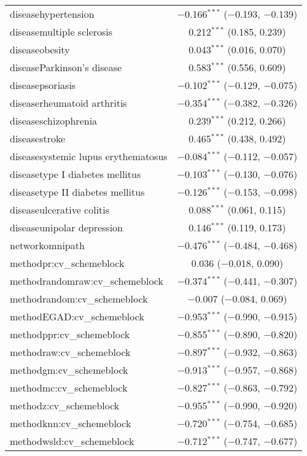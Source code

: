 \begin{table}[!htbp]
\begin{tabular}{@{\extracolsep{5pt}}lc}
  diseasehypertension & $-$0.166$^{***}$ ($-$0.193, $-$0.139) \\ 
  diseasemultiple sclerosis & 0.212$^{***}$ (0.185, 0.239) \\ 
  diseaseobesity & 0.043$^{***}$ (0.016, 0.070) \\ 
  diseaseParkinson's disease & 0.583$^{***}$ (0.556, 0.609) \\ 
  diseasepsoriasis & $-$0.102$^{***}$ ($-$0.129, $-$0.075) \\ 
  diseaserheumatoid arthritis & $-$0.354$^{***}$ ($-$0.382, $-$0.326) \\ 
  diseaseschizophrenia & 0.239$^{***}$ (0.212, 0.266) \\ 
  diseasestroke & 0.465$^{***}$ (0.438, 0.492) \\ 
  diseasesystemic lupus erythematosus & $-$0.084$^{***}$ ($-$0.112, $-$0.057) \\ 
  diseasetype I diabetes mellitus & $-$0.103$^{***}$ ($-$0.130, $-$0.076) \\ 
  diseasetype II diabetes mellitus & $-$0.126$^{***}$ ($-$0.153, $-$0.098) \\ 
  diseaseulcerative colitis & 0.088$^{***}$ (0.061, 0.115) \\ 
  diseaseunipolar depression & 0.146$^{***}$ (0.119, 0.173) \\ 
  networkomnipath & $-$0.476$^{***}$ ($-$0.484, $-$0.468) \\ 
  methodpr:cv\_schemeblock & 0.036 ($-$0.018, 0.090) \\ 
  methodrandomraw:cv\_schemeblock & $-$0.374$^{***}$ ($-$0.441, $-$0.307) \\ 
  methodrandom:cv\_schemeblock & $-$0.007 ($-$0.084, 0.069) \\ 
  methodEGAD:cv\_schemeblock & $-$0.953$^{***}$ ($-$0.990, $-$0.915) \\ 
  methodppr:cv\_schemeblock & $-$0.855$^{***}$ ($-$0.890, $-$0.820) \\ 
  methodraw:cv\_schemeblock & $-$0.897$^{***}$ ($-$0.932, $-$0.863) \\ 
  methodgm:cv\_schemeblock & $-$0.913$^{***}$ ($-$0.957, $-$0.868) \\ 
  methodmc:cv\_schemeblock & $-$0.827$^{***}$ ($-$0.863, $-$0.792) \\ 
  methodz:cv\_schemeblock & $-$0.955$^{***}$ ($-$0.990, $-$0.920) \\ 
  methodknn:cv\_schemeblock & $-$0.720$^{***}$ ($-$0.754, $-$0.685) \\ 
  methodwsld:cv\_schemeblock & $-$0.712$^{***}$ ($-$0.747, $-$0.677) \\ 

\end{tabular}
\end{table}
